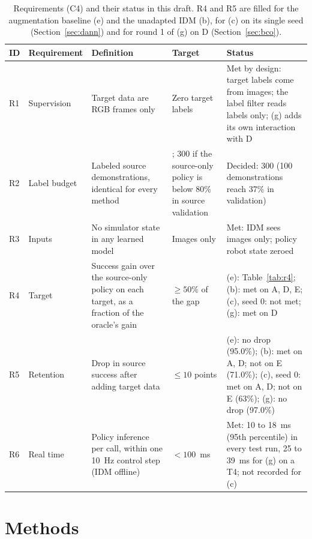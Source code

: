 \documentclass{article}
\begin{document}
\begin{table}[t]
  \caption{Requirements (C4) and their status in this draft. R4 and R5 are filled for
  the augmentation baseline (e) and the unadapted IDM (b), for (c) on its single
  seed (Section~\ref{sec:dann}) and for round 1 of (g) on D (Section~\ref{sec:bco}).}
  \label{tab:requirements}
  \centering
  \small
  \begin{tabular}{@{}>{\raggedright\arraybackslash}p{0.5cm}>{\raggedright\arraybackslash}p{1.7cm}>{\raggedright\arraybackslash}p{4.4cm}>{\raggedright\arraybackslash}p{2.1cm}>{\raggedright\arraybackslash}p{3.5cm}@{}}
    \toprule
    ID & Requirement & Definition & Target & Status \\
    \midrule
    R1 & Supervision & Target data are RGB frames only & Zero target labels &
      Met by design: target labels come from images; the label filter reads labels only;
      (g) adds its own interaction with D \\
    R2 & Label budget & Labeled source demonstrations, identical for every method &
      100; 300 if the source-only policy is below 80\% in source validation &
      Decided: 300 (100 demonstrations reach 37\% in validation) \\
    R3 & Inputs & No simulator state in any learned model & Images only &
      Met: IDM sees images only; policy robot state zeroed \\
    R4 & Target & Success gain over the source-only policy on each target, as a fraction
      of the oracle's gain & $\geq 50\%$ of the gap &
      (e): Table~\ref{tab:r4}; (b): met on A, D, E; (c), seed 0: not met; (g): met on D \\
    R5 & Retention & Drop in source success after adding target data & $\leq 10$ points &
      (e): no drop (95.0\%); (b): met on A, D; not on E (71.0\%); (c), seed 0: met on A, D;
      not on E (63\%); (g): no drop (97.0\%) \\
    R6 & Real time & Policy inference per call, within one 10~Hz control step (IDM
      offline) & $< 100$~ms & Met: 10 to 18~ms (95th percentile) in every test run, 25 to
      39~ms for (g) on a T4; not recorded for (c) \\
    \bottomrule
  \end{tabular}
\end{table}

\section{Methods}
\end{document}
